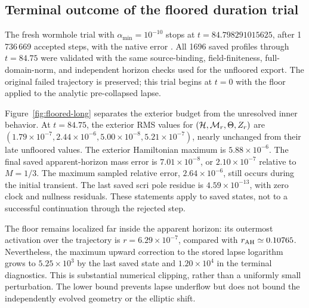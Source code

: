 \subsection{Terminal outcome of the floored duration trial}
\label{sec:floored-long}
The fresh wormhole trial with $\alpha_{\min}=10^{-10}$ stops at $t=84.798291015625$, after 1\,736\,669 accepted steps, with the native error . All 1696 saved profiles through $t=84.75$ were validated with the same source-binding, field-finiteness, full-domain-norm, and independent horizon checks used for the unfloored export. The original failed trajectory is preserved; this trial begins at $t=0$ with the floor applied to the analytic pre-collapsed lapse.

Figure~\ref{fig:floored-long} separates the exterior budget from the unresolved inner behavior. At $t=84.75$, the exterior RMS values for $(\mathcal H,\mathcal M_r,\Theta,Z_r)$ are $(1.79\times10^{-7},2.44\times10^{-6},5.00\times10^{-8},5.21\times10^{-7})$, nearly unchanged from their late unfloored values. The exterior Hamiltonian maximum is $5.88\times10^{-6}$. The final saved apparent-horizon mass error is $7.01\times10^{-8}$, or $2.10\times10^{-7}$ relative to $M=1/3$. The maximum sampled relative error, $2.64\times10^{-6}$, still occurs during the initial transient. The last saved scri pole residue is $4.59\times10^{-13}$, with zero clock and nullness residuals. These statements apply to saved states, not to a successful continuation through the rejected step.

The floor remains localized far inside the apparent horizon: its outermost activation over the trajectory is $r=6.29\times10^{-7}$, compared with $r_{\rm AH}\simeq0.10765$. Nevertheless, the maximum upward correction to the stored lapse logarithm grows to $5.25\times10^3$ by the last saved state and $1.20\times10^4$ in the terminal diagnostics. This is substantial numerical clipping, rather than a uniformly small perturbation. The lower bound prevents lapse underflow but does not bound the independently evolved geometry or the elliptic shift.

